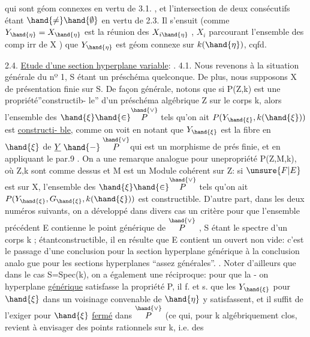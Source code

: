 
qui sont géom connexes  en vertu de 3.1. , et  l'intersection
de deux consécutifs étant $\hand{\neq} \hand{\emptyset}$ en vertu de 2.3. Il s'ensuit (comme
$Y_{\hand{\eta}} = X_{\hand{\eta}}$ est la réunion des $X_{i\hand{\eta}}$ , $X_i$ parcourant l'ensemble des comp
irr de X ) que  $Y_{\hand{\eta}}$ est géom connexe sur $k(\hand{\eta})$, cqfd.

2.4. \uline{Etude d'une section hyperplane variable}:  .
4.1.
Nous revenons à la situation générale du nº 1, S étant un préschéma
quelconque. De plus, nous supposons X de présentation finie sur S.
De façon générale, notons que si P(Z,k) est une propriété''constructib-%
le''  d'un préschéma algébrique Z sur le corps k,
alors l'ensemble des $\hand{\xi} \hand{\in} \overset{\hand{\vee}}{P}$ tels qu'on ait $P(Y_{\hand{\xi}},k(\hand{\xi}))$ est \uline{constructi-%
ble}, comme on voit en notant que $Y_{\hand{\xi}}$ est la fibre en $\hand{\xi}$ de $\underline{Y} \mathrel{\hand{-}} \overset{\hand{\vee}}{P}$\hand{,}qui
est un morphisme de prés finie, et en appliquant le par.9 . On a une
remarque analogue pour une\hand{|}propriété P(Z,M,k), où Z,k sont comme dessus
et M est un Module cohérent sur Z: si $\unsure{F|E}$ est  sur X, l'ensemble
des $\hand{\xi} \hand{\in} \overset{\hand{\vee}}{P}$ tels qu'on ait $P(Y_{\hand{\xi}},G_{\hand{\xi}},k(\hand{\xi}))$ est constructible. D'autre
part, dans les deux numéros suivants, on a développé  dans divers
cas un critère pour que l'ensemble précédent E contienne le point
générique de $\overset{\hand{\vee}}{P}$ , S étant le spectre d'un corps k ; étantconstructible,
il en résulte que E contient un ouvert non vide: c'est le passage d'une
conclusion pour la section hyperplane générique à la conclusion analo
gue pour les sections hyperplanes ``assez générales''.  \hand{[}\hand{]}. Noter d'ailleurs que \margin{$\downarrow$}
dans le cas S=Spec(k), on a également une réciproque: pour que la -%
on hyperplane \uline{générique} satisfasse la propriété P, il f. et s. que
les $Y_{\hand{\xi}}$ pour $\hand{\xi}$ dans un voisinage convenable de $\hand{\eta}$ y satisfassent, et il
suffit de l'exiger pour $\hand{\xi}$ \uline{fermé} dans $\overset{\hand{\vee}}{P}$ (ce qui, pour k algébriquement
clos, revient à envisager des points rationnels sur k, i.e. des



